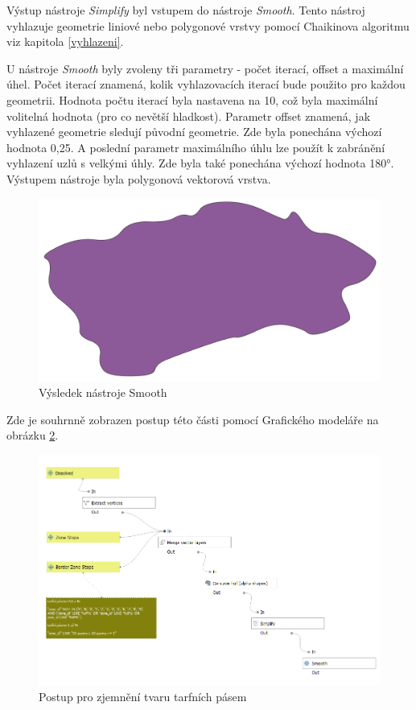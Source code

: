 Výstup nástroje \textit{Simplify} byl vstupem do nástroje \textit{Smooth}. Tento nástroj vyhlazuje geometrie
liniové nebo polygonové vrstvy pomocí Chaikinova algoritmu viz kapitola \ref{vyhlazeni}.

U nástroje \textit{Smooth} byly zvoleny tři parametry - počet iterací, offset a maximální úhel.
Počet iterací znamená, kolik vyhlazovacích iterací bude použito pro každou geometrii.
Hodnota počtu iterací byla nastavena na 10, což byla maximální volitelná hodnota (pro co nevětší hladkost).
Parametr offset znamená, jak  vyhlazené geometrie sledují původní geometrie.
Zde byla ponechána výchozí hodnota 0,25. A poslední parametr maximálního úhlu lze použít
k zabránění vyhlazení uzlů s velkými úhly. Zde byla také ponechána výchozí hodnota 180°.
Výstupem nástroje byla polygonová vektorová vrstva.

\begin{figure}[H] \centering
    \includegraphics[width=400pt]{./pictures/smooth-P0B.png}
    \caption[Výsledek nástroje Smooth]{Výsledek nástroje Smooth}
	\label{fig:smooth-P0B}                                
\end{figure}

Zde je souhrnně zobrazen postup této části pomocí Grafického modeláře na obrázku \ref{fig:postup-smooth}.

\begin{figure}[H] \centering
    \includegraphics[width=400pt]{./pictures/postup-smooth.png}
    \caption[Postup pro zjemnění tvaru tarfních pásem]{Postup pro zjemnění tvaru tarfních pásem}
	\label{fig:postup-smooth}              
\end{figure}

